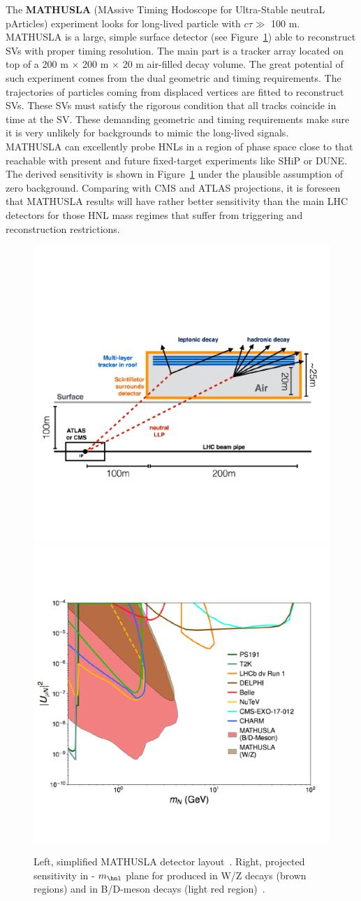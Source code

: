 The \textbf{MATHUSLA} (MAssive Timing
Hodoscope for Ultra-Stable neutraL pArticles) experiment looks for
long-lived particle with $c\tau \gg$ 100 m. MATHUSLA is a
large, simple surface detector (see Figure~\ref{fig:mathu2}) able to reconstruct SVs with proper timing
resolution. The main
part is a tracker array located on top of a 200 m $\times$ 200 m
$\times$ 20 m air-filled decay volume.
The great potential of such experiment comes from the dual geometric and timing
requirements. The trajectories of particles coming from displaced
vertices are fitted to reconstruct SVs. These SVs must satisfy the rigorous
condition that all tracks coincide in time at the SV. These demanding geometric and timing
requirements make sure it is very unlikely for backgrounds to mimic
the long-lived signals.\\
MATHUSLA can excellently probe HNLs in a region of phase space close to that reachable
with present and future fixed-target experiments like SHiP or
DUNE. The derived sensitivity is shown in Figure~\ref{fig:mathu2} under
the plausible assumption of zero background. Comparing with CMS and
ATLAS projections, it is foreseen that MATHUSLA results will have rather
better sensitivity than the main LHC detectors for those HNL mass
regimes that suffer from triggering and reconstruction restrictions.
\begin{figure}[h!]
\centering
    \includegraphics[clip,trim=0.3cm 0cm 1.cm 2cm, width=.45\textwidth]{Figures/c7/mathusla1.pdf}
    \includegraphics[clip,trim=0cm 2cm 0.5cm 3cm, width=.54\textwidth]{Figures/c7/mathusla2.pdf}
\caption{Left, simplified MATHUSLA detector
  layout~\cite{Alimena_2020}. Right, projected sensitivity in \mixparm
  - $m_\hnl$ plane for \hnl produced in W/Z decays (brown regions) and in B/D-meson decays (light red region)~\cite{Curtin_2019}.
}
\label{fig:mathu2}
\end{figure}

